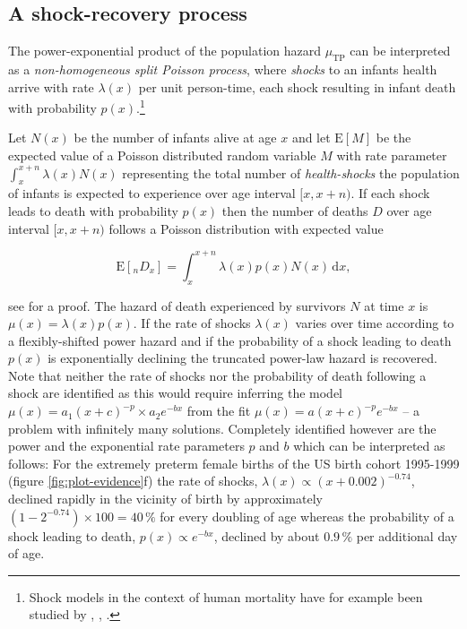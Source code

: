 \documentclass[smallextended]{svjour3} %
\begin{document}
\subsection*{A shock-recovery process}\label{a-shock-recovery-process}

The power-exponential product of the population hazard \(\mu_\text{TP}\)
can be interpreted as a \emph{non-homogeneous split Poisson process},
where \emph{shocks} to an infants health arrive with rate \(\lambda(x)\)
per unit person-time, each shock resulting in infant death with
probability \(p(x)\).\footnote{Shock models in the context of human
  mortality have for example been studied by \citet{Strehler1960},
  \citet{Finkelstein2005}, \citet{Cha2016}.}

Let \(N(x)\) be the number of infants alive at age \(x\) and let
\(\text{E}{[M]}\) be the expected value of a Poisson distributed random
variable \(M\) with rate parameter \(\int_x^{x+n}\lambda(x)N(x)\)
representing the total number of \emph{health-shocks} the population of
infants is expected to experience over age interval \([x, x+n)\). If
each shock leads to death with probability \(p(x)\) then the number of
deaths \(D\) over age interval \([x, x+n)\) follows a Poisson
distribution with expected value

\[
\text{E}[{}_{n}D_x]=\int_x^{x+n}\lambda(x)p(x)N(x)\,\text{d}x,
\]

see \citet{Prekopa1958} for a proof. The hazard of death experienced by
survivors \(N\) at time \(x\) is \(\mu(x) = \lambda(x)p(x)\). If the
rate of shocks \(\lambda(x)\) varies over time according to a
flexibly-shifted power hazard and if the probability of a shock leading
to death \(p(x)\) is exponentially declining the truncated power-law
hazard is recovered. Note that neither the rate of shocks nor the
probability of death following a shock are identified as this would
require inferring the model \(\mu(x)=a_1(x+c)^{-p}\times a_2e^{-bx}\)
from the fit \(\mu(x)=a(x+c)^{-p}e^{-bx}\) -- a problem with infinitely
many solutions. Completely identified however are the power and the
exponential rate parameters \(p\) and \(b\) which can be interpreted as
follows: For the extremely preterm female births of the US birth cohort
1995-1999 (figure \ref{fig:plot-evidence}f) the rate of shocks,
\(\lambda(x)\propto(x+0.002)^{-0.74}\), declined rapidly in the vicinity
of birth by approximately \((1-2^{-0.74})\times100=40\,\%\) for every
doubling of age whereas the probability of a shock leading to death,
\(p(x)\propto e^{-bx}\), declined by about \(0.9\,\%\) per additional
day of age.
\end{document}
